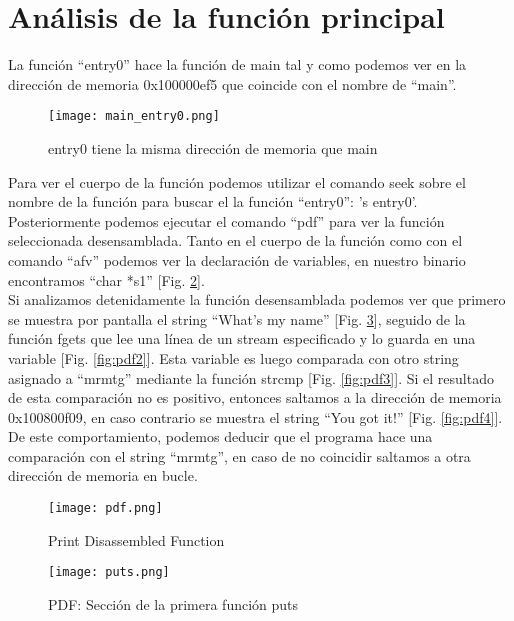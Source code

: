 \documentclass[10pt,a4paper]{article}
\begin{document}
\section{Análisis de la función principal}
La función ``entry0'' hace la función de main tal y como podemos ver en la dirección de memoria 0x100000ef5 que coincide con el nombre de ``main''.

\begin{figure}[h!]
  \centering
  \texttt{[image: main\_entry0.png]}\\
  \caption{entry0 tiene la misma dirección de memoria que main}
  \label{fig:pdf}
\end{figure}

Para ver el cuerpo de la función podemos utilizar el comando seek sobre el nombre de la función para buscar el la función ``entry0'': 's entry0'. Posteriormente podemos ejecutar el comando ``pdf'' para ver la función seleccionada desensamblada. Tanto en el cuerpo de la función como con el comando ``afv'' podemos ver la declaración de variables, en nuestro binario encontramos ``char *s1'' \cite{radarebook} [Fig. \ref{fig:pdf}].\\

Si analizamos detenidamente la función desensamblada podemos ver que primero se muestra por pantalla el string ``What's my name'' [Fig. \ref{fig:pdf1}], seguido de la función fgets que lee una línea de un stream especificado y lo guarda en una variable [Fig. \ref{fig:pdf2}]. Esta variable es luego comparada con otro string asignado a ``mrmtg'' mediante la función strcmp [Fig. \ref{fig:pdf3}]. Si el resultado de esta comparación no es positivo, entonces saltamos a la dirección de memoria 0x100800f09, en caso contrario se muestra el string ``You got it!'' [Fig. \ref{fig:pdf4}].\\

De este comportamiento, podemos deducir que el programa hace una comparación con el string ``mrmtg'', en caso de no coincidir saltamos a otra dirección de memoria en bucle.

\begin{figure}[h!]
  \centering
  \texttt{[image: pdf.png]}\\
  \caption{Print Disassembled Function}
  \label{fig:pdf}
\end{figure}

\begin{figure}[h!]
  \centering
  \texttt{[image: puts.png]}\\
  \caption{PDF: Sección de la primera función puts}
  \label{fig:pdf1}
\end{figure}
\end{document}
